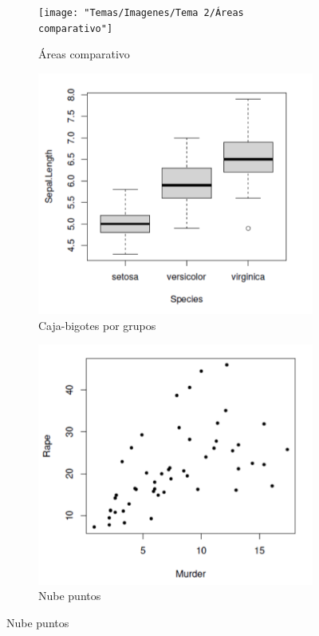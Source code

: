 \begin{figure}[h]
	\begin{subfigure}{0.5\textwidth}
		\centering
		\texttt{[image: "Temas/Imagenes/Tema 2/Áreas comparativo"]}
		\caption*{Áreas comparativo}
	\end{subfigure}
	\begin{subfigure}{0.5\textwidth}
		\centering
		\includegraphics[width=0.8\linewidth]{"Temas/Imagenes/Tema 2/Caja-bigotes por grupos"}
		\caption*{Caja-bigotes por grupos}
	\end{subfigure}
	\begin{subfigure}{0.5\textwidth}
		\centering
		\includegraphics[width=0.8\linewidth]{"Temas/Imagenes/Tema 2/Nube puntos"}
		\caption*{Nube puntos}
	\end{subfigure}
\end{figure}
\newpage
